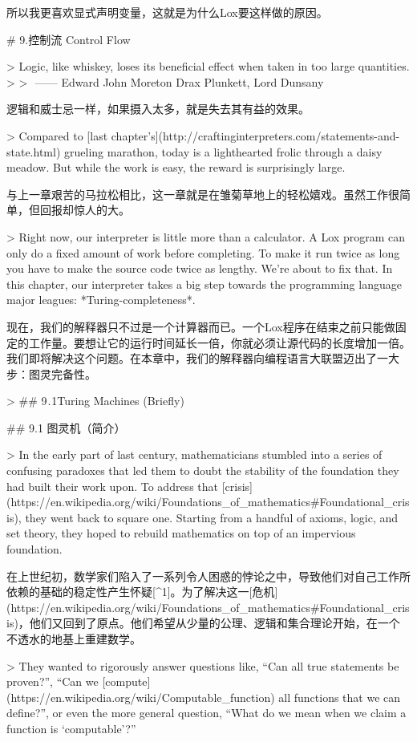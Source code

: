 \documentclass[cn,11pt,chinese]{elegantbook}
\begin{document}
{所以我更喜欢显式声明变量，这就是为什么Lox要这样做的原因。

# 9.控制流 Control Flow

> Logic, like whiskey, loses its beneficial effect when taken in too large quantities.
>
> ​                                                                                                         ——    Edward John Moreton Drax Plunkett, Lord Dunsany

逻辑和威士忌一样，如果摄入太多，就是失去其有益的效果。

> Compared to [last chapter’s](http://craftinginterpreters.com/statements-and-state.html) grueling marathon, today is a lighthearted frolic through a daisy meadow. But while the work is easy, the reward is surprisingly large.

与上一章艰苦的马拉松相比，这一章就是在雏菊草地上的轻松嬉戏。虽然工作很简单，但回报却惊人的大。

> Right now, our interpreter is little more than a calculator. A Lox program can only do a fixed amount of work before completing. To make it run twice as long you have to make the source code twice as lengthy. We’re about to fix that. In this chapter, our interpreter takes a big step towards the programming language major leagues: *Turing-completeness*.

现在，我们的解释器只不过是一个计算器而已。一个Lox程序在结束之前只能做固定的工作量。要想让它的运行时间延长一倍，你就必须让源代码的长度增加一倍。我们即将解决这个问题。在本章中，我们的解释器向编程语言大联盟迈出了一大步：图灵完备性。

> ## 9 . 1Turing Machines (Briefly)

## 9.1 图灵机（简介）

> In the early part of last century, mathematicians stumbled into a series of confusing paradoxes that led them to doubt the stability of the foundation they had built their work upon. To address that [crisis](https://en.wikipedia.org/wiki/Foundations_of_mathematics#Foundational_crisis), they went back to square one. Starting from a handful of axioms, logic, and set theory, they hoped to rebuild mathematics on top of an impervious foundation.

在上世纪初，数学家们陷入了一系列令人困惑的悖论之中，导致他们对自己工作所依赖的基础的稳定性产生怀疑[^1]。为了解决这一[危机](https://en.wikipedia.org/wiki/Foundations_of_mathematics#Foundational_crisis)，他们又回到了原点。他们希望从少量的公理、逻辑和集合理论开始，在一个不透水的地基上重建数学。

> They wanted to rigorously answer questions like, “Can all true statements be proven?”, “Can we [compute](https://en.wikipedia.org/wiki/Computable_function) all functions that we can define?”, or even the more general question, “What do we mean when we claim a function is ‘computable’?”

}
\end{document}
